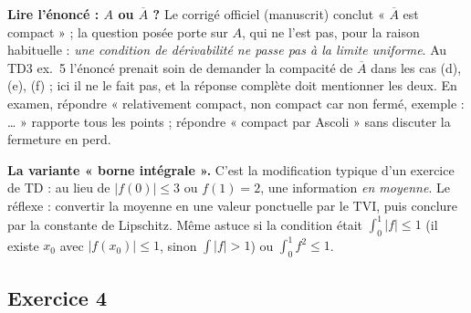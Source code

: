 \documentclass[11pt,a4paper]{article}
\newcommand{\adh}[1]{\overline{#1}}
\theoremstyle{definition}
\begin{document}
\begin{piege}
\textbf{Lire l'énoncé : $A$ ou $\adh A$ ?} Le corrigé officiel (manuscrit) conclut « $\adh A$ est compact » ; la question posée porte sur $A$, qui ne l'est pas, pour la raison habituelle : \emph{une condition de dérivabilité ne passe pas à la limite uniforme}. Au TD3 ex.~5 l'énoncé prenait soin de demander la compacité de $\adh A$ dans les cas (d), (e), (f) ; ici il ne le fait pas, et la réponse complète doit mentionner les deux. En examen, répondre « relativement compact, non compact car non fermé, exemple : … » rapporte tous les points ; répondre « compact par Ascoli » sans discuter la fermeture en perd.

\textbf{La variante « borne intégrale ».} C'est la modification typique d'un exercice de TD : au lieu de $|f(0)|\le3$ ou $f(1)=2$, une information \emph{en moyenne}. Le réflexe : convertir la moyenne en une valeur ponctuelle par le TVI, puis conclure par la constante de Lipschitz. Même astuce si la condition était $\int_0^1|f|\le1$ (il existe $x_0$ avec $|f(x_0)|\le1$, sinon $\int|f|>1$) ou $\int_0^1f^2\le1$.
\end{piege}

\subsection*{Exercice 4}
\end{document}
